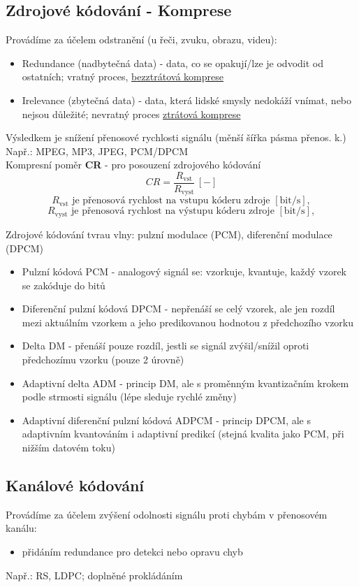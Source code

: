 \subsection{Zdrojové kódování - Komprese}
Provádíme za účelem odstranění (u řeči, zvuku, obrazu, videu):
\begin{itemize}
	\item Redundance (nadbytečná data) - data, co se opakují/lze je odvodit od ostatních; vratný proces, \underline{bezztrátová komprese}
	\item Irelevance (zbytečná data) - data, která lidské smysly nedokáží vnímat, nebo nejsou důležité; nevratný proces \underline{ztrátová komprese}
\end{itemize}
Výsledkem je snížení přenosové rychlosti signálu (měnší šířka pásma přenos. k.)
Např.: MPEG, MP3, JPEG, PCM/DPCM\\

Kompresní poměr \textbf{CR} - pro posouzení zdrojového kódování
\begin{equation}
	CR = \frac{R_{\mathrm{vst}}}{R_{\mathrm{vyst}}}\,[-]
\end{equation}
\[R_{\mathrm{vst}} \text{ je přenosová rychlost na vstupu kóderu zdroje } [\mathrm{bit/s}],\]
\[R_{\mathrm{vyst}} \text{ je přenosová rychlost na výstupu kóderu zdroje } [\mathrm{bit/s}],\]

Zdrojové kódování tvrau vlny: pulzní modulace (PCM), diferenční modulace (DPCM)
\begin{itemize}
	\item Pulzní kódová PCM - analogový signál se: vzorkuje, kvantuje, každý vzorek se zakóduje do bitů
	\item Diferenční pulzní kódová DPCM - nepřenáší se celý vzorek, ale jen rozdíl mezi aktuálním vzorkem a jeho predikovanou hodnotou z předchozího vzorku
	\item Delta DM - přenáší pouze rozdíl, jestli se signál zvýšil/snížil oproti předchozímu vzorku (pouze 2 úrovně)
	\item Adaptivní delta ADM - princip DM, ale s proměnným kvantizačním krokem podle strmosti signálu (lépe sleduje rychlé změny)
	\item Adaptivní diferenční pulzní kódová ADPCM - princip DPCM, ale s adaptivním kvantováním i adaptivní predikcí (stejná kvalita jako PCM, při nižším datovém toku)
\end{itemize}

\subsection{Kanálové kódování}
Provádíme za účelem zvýšení odolnosti signálu proti chybám v přenosovém kanálu:
\begin{itemize}
	\item přidáním redundance pro detekci nebo opravu chyb
\end{itemize}
Např.: RS, LDPC; doplněné prokládáním

